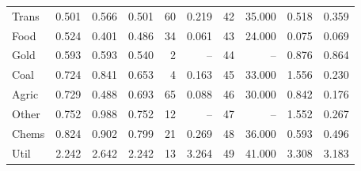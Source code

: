 \begin{table}
\begin{tabular}{lrrrrrrrrr}
Trans & 0.501 & 0.566 & 0.501 & 60 & 0.219 & 42 & 35.000 & 0.518 & 0.359 \\
Food & 0.524 & 0.401 & 0.486 & 34 & 0.061 & 43 & 24.000 & 0.075 & 0.069 \\
Gold & 0.593 & 0.593 & 0.540 & 2 & -- & 44 & -- & 0.876 & 0.864 \\
Coal & 0.724 & 0.841 & 0.653 & 4 & 0.163 & 45 & 33.000 & 1.556 & 0.230 \\
Agric & 0.729 & 0.488 & 0.693 & 65 & 0.088 & 46 & 30.000 & 0.842 & 0.176 \\
Other & 0.752 & 0.988 & 0.752 & 12 & -- & 47 & -- & 1.552 & 0.267 \\
Chems & 0.824 & 0.902 & 0.799 & 21 & 0.269 & 48 & 36.000 & 0.593 & 0.496 \\
Util & 2.242 & 2.642 & 2.242 & 13 & 3.264 & 49 & 41.000 & 3.308 & 3.183 \\
\bottomrule
\end{tabular}
\end{table}

